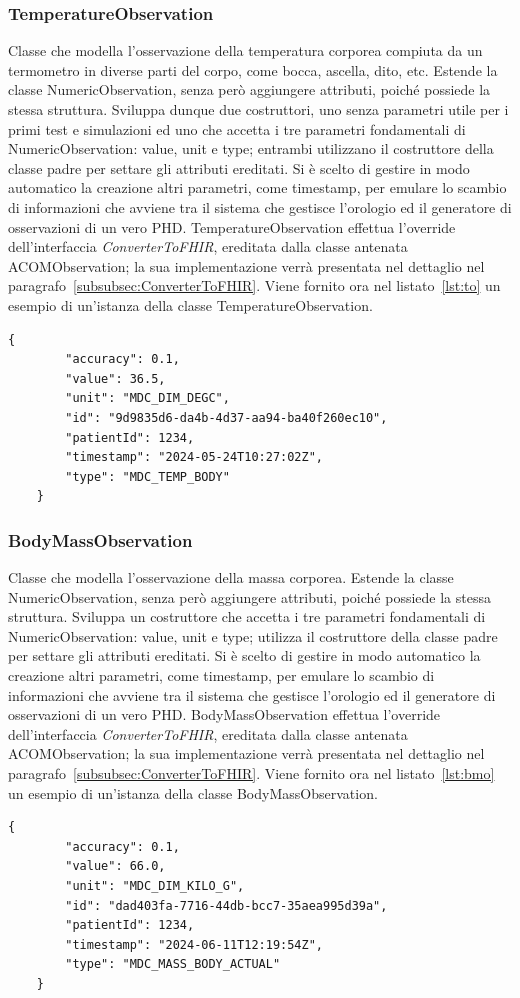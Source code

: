 \documentclass[a4paper]{article}
\begin{document}
\subsubsection*{TemperatureObservation}
Classe che modella l'osservazione della temperatura corporea compiuta da un termometro in diverse parti del corpo, come bocca, ascella, dito, etc.
Estende la classe NumericObservation, senza però aggiungere attributi, poiché possiede la stessa struttura. Sviluppa dunque due costruttori, uno senza parametri utile per i primi test e simulazioni ed uno che accetta i tre parametri fondamentali di NumericObservation: value, unit e type; entrambi utilizzano il costruttore della classe padre per settare gli attributi ereditati.
Si è scelto di gestire in modo automatico la creazione altri parametri, come timestamp, per emulare lo scambio di informazioni che avviene tra il sistema che gestisce l'orologio ed il generatore di osservazioni di un vero PHD.
TemperatureObservation effettua l'override dell'interfaccia \textit{ConverterToFHIR}, ereditata dalla classe antenata ACOMObservation; la sua implementazione verrà presentata nel dettaglio nel paragrafo~\ref{subsubsec:ConverterToFHIR}.
Viene fornito ora nel listato~\ref{lst:to} un esempio di un'istanza della classe TemperatureObservation.
\begin{lstlisting}[caption={Esempio istanza di TemperatureObservation},label={lst:to}]
    {
        "accuracy": 0.1,
        "value": 36.5,
        "unit": "MDC_DIM_DEGC",
        "id": "9d9835d6-da4b-4d37-aa94-ba40f260ec10",
        "patientId": 1234,
        "timestamp": "2024-05-24T10:27:02Z",
        "type": "MDC_TEMP_BODY"
    }
\end{lstlisting}
\subsubsection*{BodyMassObservation}
Classe che modella l'osservazione della massa corporea.
Estende la classe NumericObservation, senza però aggiungere attributi, poiché possiede la stessa struttura.
Sviluppa un costruttore che accetta i tre parametri fondamentali di NumericObservation: value, unit e type; utilizza il costruttore della classe padre per settare gli attributi ereditati.
Si è scelto di gestire in modo automatico la creazione altri parametri, come timestamp, per emulare lo scambio di informazioni che avviene tra il sistema che gestisce l'orologio ed il generatore di osservazioni di un vero PHD.
BodyMassObservation effettua l'override dell'interfaccia \textit{ConverterToFHIR}, ereditata dalla classe antenata ACOMObservation; la sua implementazione verrà presentata nel dettaglio nel paragrafo~\ref{subsubsec:ConverterToFHIR}.
Viene fornito ora nel listato~\ref{lst:bmo} un esempio di un'istanza della classe BodyMassObservation.
\begin{lstlisting}[caption={Esempio istanza di BodyMassObservation},label={lst:bmo}]
    {
        "accuracy": 0.1,
        "value": 66.0,
        "unit": "MDC_DIM_KILO_G",
        "id": "dad403fa-7716-44db-bcc7-35aea995d39a",
        "patientId": 1234,
        "timestamp": "2024-06-11T12:19:54Z",
        "type": "MDC_MASS_BODY_ACTUAL"
    }
\end{lstlisting}
\end{document}
